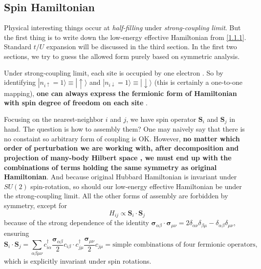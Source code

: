 \documentclass[10pt,nofootinbib]{revtex4}
\begin{document}
	\subsection{Spin Hamiltonian}
		Physical interesting things occur at \emph{half-filling} under \emph{strong-coupling limit}. But the first thing is to write down the low-energy effective Hamiltonian from \eqref{1.1.1}. Standard $t/U$ expansion will be discussed in the third section. In the first two sections, we try to guess the allowed form purely based on symmetric analysis.\par
		Under strong-coupling limit, each site is occupied by one electron \cite{Fradkin2013Field}. So by identifying $|n_{i\uparrow}=1\rangle\equiv|\uparrow\rangle$ and $|n_{i\downarrow}=1\rangle\equiv|\downarrow\rangle$ (this is certainly a one-to-one mapping), \textbf{one can always express the fermionic form of Hamiltonian with spin degree of freedom on each site} \cite{macdonald1988t}.\par
		Focusing on the nearest-neighbor $i$ and $j$, we have spin operator $\bm{S}_i$ and $\bm{S}_j$ in hand. The question is how to assembly them? One may naively say that there is no constaint so arbitrary form of coupling is OK. However, \textbf{no matter which order of perturbation we are working with, after decomposition and projection of many-body Hilbert space \cite{macdonald1988t,chernyshev2004higher}, we must end up with the combinations of terms holding the same symmetry as original Hamiltonian}. And because original Hubbard Hamiltonian is invariant under $SU(2)$ spin-rotation, so should our low-energy effective Hamiltonian be under the strong-coupling limit. All the other forms of assembly are forbidden by symmetry, except for 
		\begin{equation*}
			H_{ij}\propto\bm{S}_i\cdot\bm{S}_j
		\end{equation*}
		because of the strong dependence of the identity $\bm{\sigma}_{\alpha \beta}\cdot\bm{\sigma}_{\mu\nu}=2\delta_{\alpha\nu}\delta_{\beta\mu}-\delta_{\alpha \beta}\delta_{\mu\nu}$, ensuring
		\begin{equation*}
			\bm{S}_i\cdot\bm{S}_j=\sum_{\alpha \beta \mu \nu}c_{i \alpha}^\dagger\dfrac{\bm{\sigma}_{\alpha \beta}}{2}c_{i \beta}\cdot c_{j \mu}^\dagger\dfrac{\bm{\sigma}_{\mu\nu}}{2}c_{j \mu}=\text{simple combinations of four fermionic operators},
		\end{equation*}
		which is explicitly invariant under spin rotations.
	
\end{document}
